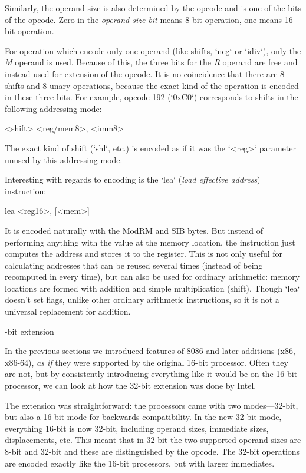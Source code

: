Similarly, the operand size is also determined by the opcode and is one of the
bits of the opcode. Zero in the {\em operand size bit} means 8-bit operation,
one means 16-bit operation.

For operation which encode only one operand (like shifts, `neg` or `idiv`), only
the {\em M} operand is used. Because of this, the three bits for the {\em R}
operand are free and instead used for extension of the opcode. It is
no coincidence that there are 8 shifts and 8 unary operations, because the exact
kind of the operation is encoded in these three bits. For example, opcode 192
(`0xC0`) corresponds to shifts in the following addressing mode:

\begtt \optparams
<shift> <reg/mem8>, <imm8>
\endtt

The exact kind of shift (`shl`, etc.) is encoded as if it was the `<reg>`
parameter unused by this addressing mode.

Interesting with regards to encoding is the `lea` ({\em load effective
address}) instruction:

\begtt \optparams
lea <reg16>, [<mem>]
\endtt

It is encoded naturally with the ModRM and SIB bytes. But instead of performing
anything with the value at the memory location, the instruction just computes
the address and stores it to the register. This is not only useful for
calculating addresses that can be reused several times (instead of being
recomputed in every time), but can also be used for ordinary arithmetic: memory
locations are formed with addition and simple multiplication (shift). Though
`lea` doesn't set flags, unlike other ordinary arithmetic instructions, so it is
not a universal replacement for addition.


%

-bit extension

In the previous sections we introduced features of 8086 and later additions
(x86, x86-64), {\em as if} they were supported by the original 16-bit processor.
Often they are not, but by consistently introducing everything like it would be
on the 16-bit processor, we can look at how the 32-bit extension was done by
Intel.

The extension was straightforward: the processors came with two
modes---32-bit, but also a 16-bit mode for backwards compatibility. In the
new 32-bit mode, everything 16-bit is now 32-bit, including operand sizes,
immediate sizes, displacements, etc. This meant that in 32-bit the two supported
operand sizes are 8-bit and 32-bit and these are distinguished by the opcode.
The 32-bit operations are encoded exactly like the 16-bit processors, but with
larger immediates.

